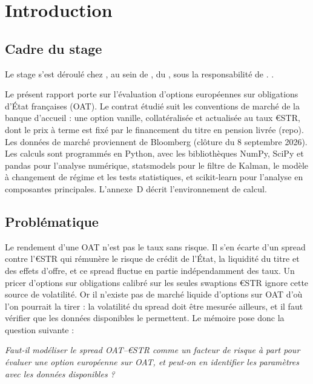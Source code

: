 \section*{Introduction}

\subsection*{Cadre du stage}

Le stage s'est déroulé chez , au sein de , du
, sous la responsabilité de .
.

Le présent rapport porte sur l'évaluation d'options européennes sur obligations d'État françaises (OAT). Le
contrat étudié suit les conventions de marché de la banque d'accueil : une option vanille, collatéralisée et
actualisée au taux €STR, dont le prix à terme est fixé par le financement du titre en pension livrée (repo). Les
données de marché proviennent de Bloomberg (clôture du 8 septembre 2026). Les calculs sont programmés en
Python, avec les bibliothèques NumPy, SciPy et pandas pour l'analyse numérique, statsmodels pour le filtre de
Kalman, le modèle à changement de régime et les tests statistiques, et scikit-learn pour l'analyse en
composantes principales. L'annexe~D décrit l'environnement de calcul.

\subsection*{Problématique}

Le rendement d'une OAT n'est pas le taux sans risque. Il s'en écarte d'un spread contre l'€STR qui rémunère le
risque de crédit de l'État, la liquidité du titre et des effets d'offre, et ce spread fluctue en partie
indépendamment des taux. Un pricer d'options sur obligations calibré sur les seules swaptions €STR ignore cette
source de volatilité. Or il n'existe pas de marché liquide d'options sur OAT d'où l'on pourrait la tirer : la
volatilité du spread doit être mesurée ailleurs, et il faut vérifier que les données disponibles le permettent.
Le mémoire pose donc la question suivante :

\begin{center}
\begin{minipage}{0.88\textwidth}
\itshape Faut-il modéliser le spread OAT–€STR comme un facteur de risque à part pour évaluer une option
européenne sur OAT, et peut-on en identifier les paramètres avec les données disponibles ?
\end{minipage}
\end{center}


